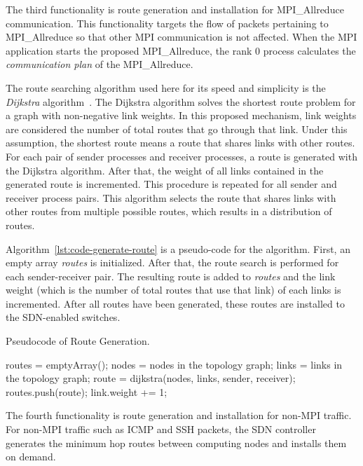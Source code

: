 The third functionality is route generation and installation for
MPI\_Allreduce communication. This functionality targets the flow of packets
pertaining to MPI\_Allreduce so that other MPI communication is not affected.
When the MPI application starts the proposed MPI\_Allreduce, the rank 0
process calculates the \emph{communication plan} of the MPI\_Allreduce.

The route searching algorithm used here for its speed and simplicity is
the \emph{Dijkstra} algorithm~\autocite{Dijkstra1959}. The Dijkstra
algorithm solves the shortest route problem for a graph with
non-negative link weights. In this proposed mechanism, link weights are
considered the number of total routes that go through that link. Under
this assumption, the shortest route means a route that shares links with
other routes. For each pair of sender processes and receiver processes,
a route is generated with the Dijkstra algorithm. After that, the weight
of all links contained in the generated route is incremented. This
procedure is repeated for all sender and receiver process pairs. This
algorithm selects the route that shares links with other routes from
multiple possible routes, which results in a distribution of routes.

Algorithm~\ref{lst:code-generate-route} is a pseudo-code for the algorithm.
First, an empty array \emph{routes} is initialized. After that, the
route search is performed for each sender-receiver pair. The resulting
route is added to \emph{routes} and the link weight (which is the number
of total routes that use that link) of each links is incremented. After
all routes have been generated, these routes are installed to the
SDN-enabled switches.

\begin{algorithm}
    \caption{Pseudocode of Route Generation.}%
    \label{lst:code-generate-route}
    \begin{algorithmic}
        \STATE routes = emptyArray();
        \STATE nodes = nodes in the topology graph;
        \STATE links = links in the topology graph;
            \STATE route = dijkstra(nodes, links, sender, receiver);
            \STATE routes.push(route);
                \STATE link.weight += 1;
            \ENDFOR
        \ENDFOR
    \end{algorithmic}
\end{algorithm}

The fourth functionality is route generation and installation for
non-MPI traffic. For non-MPI traffic such as ICMP and SSH packets, the
SDN controller generates the minimum hop routes between computing nodes
and installs them on demand.

